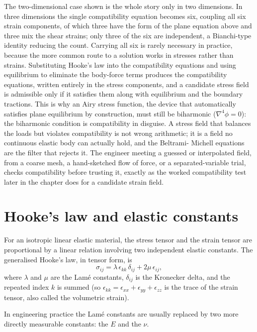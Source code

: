 The two-dimensional case shown is the whole story only in two dimensions.
In three dimensions the single compatibility equation becomes six, coupling
all six strain components, of which three have the form of the plane
equation above and three mix the shear strains; only three of the six are
independent, a Bianchi-type identity reducing the count. Carrying all six
is rarely necessary in practice, because the more common route to a
solution works in stresses rather than strains. Substituting Hooke's law
into the compatibility equations and using equilibrium to eliminate the
body-force terms produces the  compatibility
equations, written entirely in the stress components, and a candidate
stress field is admissible only if it satisfies them along with
equilibrium and the boundary tractions. This is why an Airy stress
function, the device that automatically satisfies plane equilibrium by
construction, must still be biharmonic ($\nabla^4 \phi = 0$): the
biharmonic condition is compatibility in disguise. A stress field that
balances the loads but violates compatibility is not wrong arithmetic; it
is a field no continuous elastic body can actually hold, and the Beltrami-
Michell equations are the filter that rejects it. The engineer meeting a
guessed or interpolated field, from a coarse mesh, a hand-sketched flow
of force, or a separated-variable trial, checks compatibility before
trusting it, exactly as the worked compatibility test later in the chapter
does for a candidate strain field.

\section{Hooke's law and elastic constants}

For an isotropic linear elastic material, the stress tensor and the
strain tensor are proportional by a linear relation involving two
independent elastic constants. The generalised Hooke's law, in tensor
form, is
\[
\sigma_{ij} = \lambda \,\epsilon_{kk} \,\delta_{ij} + 2\mu
\,\epsilon_{ij},
\]
where $\lambda$ and $\mu$ are the Lam\'e constants, $\delta_{ij}$ is
the Kronecker delta, and the repeated index $k$ is summed (so
$\epsilon_{kk} = \epsilon_{xx} + \epsilon_{yy} + \epsilon_{zz}$ is
the trace of the strain tensor, also called the volumetric strain).

In engineering practice the Lam\'e constants are usually replaced by
two more directly measurable constants: the 
$E$ and the  $\nu$.

